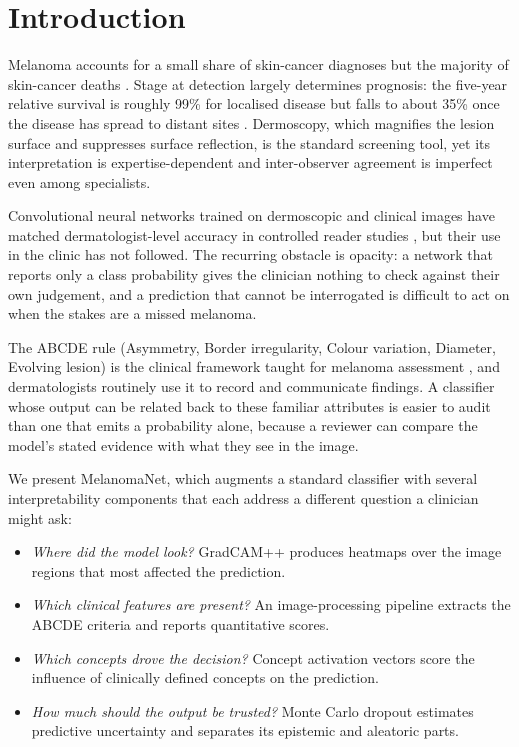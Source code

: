 \section{Introduction}

Melanoma accounts for a small share of skin-cancer diagnoses but the majority
of skin-cancer deaths \cite{siegel2023cancer}. Stage at detection largely
determines prognosis: the five-year relative survival is roughly 99\% for
localised disease but falls to about 35\% once the disease has spread to
distant sites \cite{siegel2023cancer}. Dermoscopy, which magnifies the lesion
surface and suppresses surface reflection, is the standard screening tool, yet
its interpretation is expertise-dependent and inter-observer agreement is
imperfect even among specialists.

Convolutional neural networks trained on dermoscopic and clinical images have
matched dermatologist-level accuracy in controlled reader studies
\cite{esteva2017dermatologist}, but their use in the clinic has not followed.
The recurring obstacle is opacity: a network that reports only a class
probability gives the clinician nothing to check against their own judgement,
and a prediction that cannot be interrogated is difficult to act on when the
stakes are a missed melanoma.

The ABCDE rule (Asymmetry, Border irregularity, Colour variation, Diameter,
Evolving lesion) is the clinical framework taught for melanoma assessment
\cite{abbasi2004early}, and dermatologists routinely use it to record and
communicate findings. A classifier whose output can be related back to these
familiar attributes is easier to audit than one that emits a probability alone,
because a reviewer can compare the model's stated evidence with what they see in
the image.

We present MelanomaNet, which augments a standard classifier with several
interpretability components that each address a different question a clinician
might ask:

\begin{itemize}
    \item \emph{Where did the model look?} GradCAM++ produces heatmaps over the
          image regions that most affected the prediction.
    \item \emph{Which clinical features are present?} An image-processing pipeline
          extracts the ABCDE criteria and reports quantitative scores.
    \item \emph{Which concepts drove the decision?} Concept activation vectors
          score the influence of clinically defined concepts on the prediction.
    \item \emph{How much should the output be trusted?} Monte Carlo dropout
          estimates predictive uncertainty and separates its epistemic and
          aleatoric parts.
\end{itemize}

